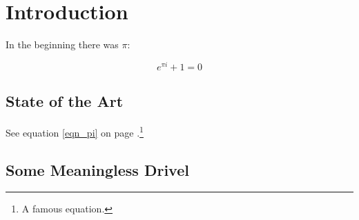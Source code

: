 \documentclass[letterpaper,12pt,titlepage,oneside,final]{book}
\begin{document}
 

\chapter{Introduction}
In the beginning there was $\pi$:

\begin{equation}
   e^{\pi i} + 1 = 0  \label{eqn_pi}
\end{equation}

\section{State of the Art}

See equation \ref{eqn_pi} on page \pageref{eqn_pi}.\footnote{A famous equation.}

\section{Some Meaningless Drivel}
\end{document}
